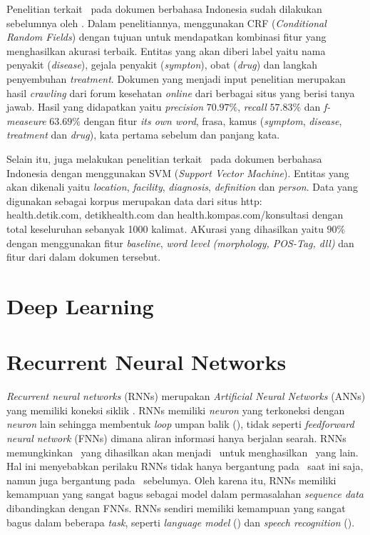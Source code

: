 Penelitian terkait \mer~pada dokumen berbahasa Indonesia sudah dilakukan sebelumnya oleh \cite{skripsiKakRadit}. Dalam penelitiannya, \cite{skripsiKakRadit} menggunakan CRF (\textit{Conditional Random Fields}) dengan tujuan untuk mendapatkan kombinasi fitur yang menghasilkan akurasi terbaik. Entitas yang akan diberi label yaitu nama penyakit (\textit{disease}), gejala penyakit (\textit{sympton}), obat (\textit{drug}) dan langkah penyembuhan \textit{treatment}. Dokumen yang menjadi input penelitian merupakan hasil \textit{crawling} dari  forum kesehatan \textit{online} dari berbagai situs yang berisi tanya jawab. Hasil yang didapatkan yaitu \textit{precision} $ 70.97\% $, \textit{recall} $ 57.83\% $ dan \textit{f-measeure} $ 63.69\% $ dengan fitur \textit{its own word}, frasa, kamus (\textit{symptom}, \textit{disease}, \textit{treatment} dan \textit{drug}), kata pertama sebelum dan panjang kata.

Selain itu, \cite{suwarningsih2014imner} juga melakukan penelitian terkait \mer~pada dokumen berbahasa Indonesia dengan menggunakan SVM (\textit{Support Vector Machine}). Entitas yang akan dikenali yaitu \textit{location}, \textit{facility}, \textit{diagnosis}, \textit{definition} dan \textit{person}. Data yang digunakan sebagai korpus merupakan data dari situs http:\\health.detik.com, detikhealth.com dan health.kompas.com/konsultasi dengan total keseluruhan sebanyak 1000 kalimat. AKurasi yang dihasilkan yaitu $ 90\% $ dengan menggunakan fitur \textit{baseline}, \textit{word level (morphology, POS-Tag, dll)} dan fitur dari dalam dokumen tersebut.

\section{Deep Learning}


\section{Recurrent Neural Networks}

\textit{Recurrent neural networks} (RNNs) merupakan \textit{Artificial Neural Networks} (ANNs) yang memiliki koneksi siklik \citep{graves2012neural}. RNNs memiliki \textit{neuron} yang terkoneksi dengan \textit{neuron} lain sehingga membentuk \textit{loop} umpan balik (\cite{haykin2009neural}), tidak seperti \textit{feedforward neural network} (FNNs) dimana aliran informasi hanya berjalan searah. RNNs memungkinkan \iob~yang dihasilkan akan menjadi \ioa~untuk menghasilkan \iob~yang lain. Hal ini menyebabkan perilaku RNNs tidak hanya bergantung pada \ioa~saat ini saja, namun juga bergantung pada \iob~sebelumya. Oleh karena itu, RNNs memiliki kemampuan yang sangat bagus sebagai model dalam permasalahan \textit{sequence data} dibandingkan dengan FNNs. RNNs sendiri memiliki kemampuan yang sangat bagus dalam beberapa \textit{task}, seperti \textit{language model} (\cite{mikolov2010recurrent}) dan \textit{speech recognition} (\cite{graves2013speech}).

